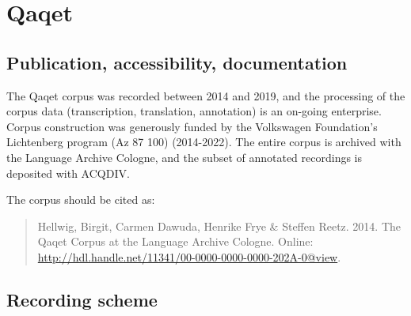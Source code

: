\documentclass[a4paper, 11pt]{book}
\begin{document}

\section{Qaqet}
\label{sec:Qaqet}

\subsection{Publication, accessibility, documentation}

The Qaqet corpus was recorded between 2014 and 2019, and the processing of the corpus data (transcription, translation, annotation) is an on-going enterprise. Corpus construction was generously funded by the Volkswagen Foundation’s Lichtenberg program (Az 87 100) (2014-2022).
The entire corpus is archived with the Language Archive Cologne, and the subset of annotated recordings is deposited with ACQDIV. 

The corpus \citep{Hellwig_etal2014} should be cited as:

\begin{quote}
	Hellwig, Birgit, Carmen Dawuda, Henrike Frye \& Steffen Reetz. 2014. The Qaqet Corpus at the Language Archive Cologne. Online: \url{http://hdl.handle.net/11341/00-0000-0000-0000-202A-0@view}.
\end{quote}

\subsection{Recording scheme}
\end{document}
